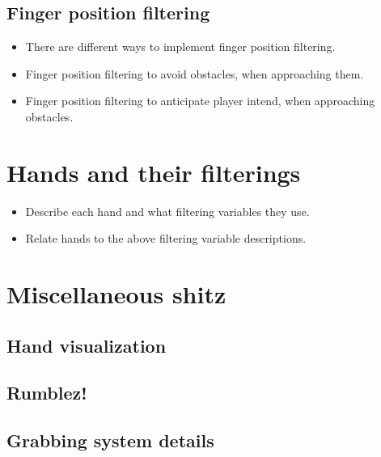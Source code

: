 \subsection{Finger position filtering}
\label{subsec:implementationFingerFiltering}
\begin{itemize}
\item There are different ways to implement finger position filtering.
\item Finger position filtering to avoid obstacles, when approaching them.
\item Finger position filtering to anticipate player intend, when approaching obstacles.
\end{itemize}

\section{Hands and their filterings}
\label{sec:LABELABOUTHANDSVERSIONS}
\begin{itemize}
\item Describe each hand and what filtering variables they use.
\item Relate hands to the above filtering variable descriptions.
\end{itemize}

\section{Miscellaneous shitz}
\label{sec:MISCELLANEOUSSHITZ}

\subsection{Hand visualization}
\label{subsec:handVisualization}

\subsection{Rumblez!}
\label{subsec:RUMLBEZ}

\subsection{Grabbing system details}
\label{subsec:grabbingSystem}